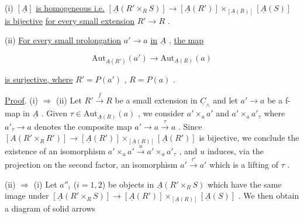 (i)  $[\underline{A}]$  \underline{is homogeneous i.e.}  $[\underline{A}(R' \times_R S)] \longrightarrow [\underline{A}(R')] \times_{[\underline{A}(R)]} [\underline{A}(S)]$  \underline{is bijective} \underline{for every small extension}  $R' \to R$  .

(ii) \underline{For every small prolongation}  $a' \to a$  \underline{in}  $\underline{A}$ , \underline{the map}

\begin{equation*}
\mathrm{Aut}_{\underline{A}(R')}(a') \longrightarrow \mathrm{Aut}_{\underline{A}(R)}(a) 
\end{equation*}


 \underline{is surjective, where}  $R' = P(a')$  ,  $R = P(a)$  .

\underline{Proof}.  (i) $\Rightarrow$ (ii)  Let  $R' \xrightarrow{\ f\ } R$  be a small extension in  $\underline{C}_{\wedge}$  and let  $a' \to a$  be a f-map in  $\underline{A}$ . Given  $\tau \in \mathrm{Aut}_{\underline{A}(R)}(a)$  , we consider  $a' \times_{a} a'$  and  $a' \times_{a} a'_{\tau}$  where  $a'_{\tau} \longrightarrow a$  denotes the composite map  $a' \longrightarrow a \xrightarrow{\ \tau\ } a$  . Since  $[A(R' \times_{R} R')] \longrightarrow [\underline{A}(R')] \times_{[\underline{A}(R)]} [\underline{A}(R')]$  is bijective, we conclude the existence of an isomorphism  $a' \times_{a} a' \xrightarrow{\ u\ } a' \times_{a} a'_{\tau}$  , and  $u$  induces, via the projection on the second factor, an isomorphism  $a' \xrightarrow{\ \tau'\ } a'$  which is a lifting of  $\tau$  .

(ii) $\Rightarrow$ (i)  Let  $a''_{i}$  ($i=1,2$)  be objects in  $\underline{A}(R' \times_{R} S)$  which have the same image under  $[\underline{A}(R' \times_{R} S)] \to [\underline{A}(R')] \times_{[\underline{A}(R)]} [\underline{A}(S)]$  . We then obtain a diagram of solid arrows

